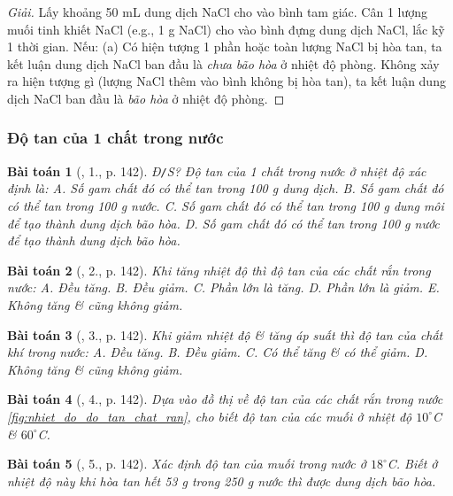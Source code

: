 \documentclass{article}
\newtheorem{baitoan}{Bài toán}
\begin{document}
\begin{proof}[Giải]
	Lấy khoảng 50 mL dung dịch NaCl cho vào bình tam giác. Cân 1 lượng muối tinh khiết NaCl (e.g., 1 g NaCl) cho vào bình đựng dung dịch NaCl, lắc kỹ 1 thời gian. Nếu: (a) Có hiện tượng 1 phần hoặc toàn lượng NaCl bị hòa tan, ta kết luận dung dịch NaCl ban đầu là \textit{chưa bão hòa} ở nhiệt độ phòng. Không xảy ra hiện tượng gì (lượng NaCl thêm vào bình không bị hòa tan), ta kết luận dung dịch NaCl ban đầu là \textit{bão hòa} ở nhiệt độ phòng.
\end{proof}

\subsubsection{Độ tan của 1 chất trong nước}

\begin{baitoan}[\cite{SGK_Hoa_Hoc_8}, 1., p. 142]
	\emph{Đ\texttt{/}S?} Độ tan của 1 chất trong nước ở nhiệt độ xác định là: {\sf A.} Số gam chất đó có thể tan trong \emph{100 g} dung dịch. {\sf B.} Số gam chất đó có thể tan trong \emph{100 g} nước. {\sf C.} Số gam chất đó có thể tan trong \emph{100 g} dung môi để tạo thành dung dịch bão hòa. {\sf D.} Số gam chất đó có thể tan trong \emph{100 g} nước để tạo thành dung dịch bão hòa.
\end{baitoan}

\begin{baitoan}[\cite{SGK_Hoa_Hoc_8}, 2., p. 142]
	Khi tăng nhiệt độ thì độ tan của các chất rắn trong nước: {\sf A.} Đều tăng. {\sf B.} Đều giảm. {\sf C.} Phần lớn là tăng. {\sf D.} Phần lớn là giảm. {\sf E.} Không tăng \& cũng không giảm.
\end{baitoan}

\begin{baitoan}[\cite{SGK_Hoa_Hoc_8}, 3., p. 142]
	Khi giảm nhiệt độ \& tăng áp suất thì độ tan của chất khí trong nước: {\sf A.} Đều tăng. {\sf B.} Đều giảm. {\sf C.} Có thể tăng \& có thể giảm. {\sf D.} Không tăng \& cũng không giảm.
\end{baitoan}

\begin{baitoan}[\cite{SGK_Hoa_Hoc_8}, 4., p. 142]
	Dựa vào đồ thị về độ tan của các chất rắn trong nước \ref{fig:nhiet_do_do_tan_chat_ran}, cho biết độ tan của các muối \emph{} ở nhiệt độ $10^\circ$\emph{C} \& $60^\circ$C.
\end{baitoan}

\begin{baitoan}[\cite{SGK_Hoa_Hoc_8}, 5., p. 142]
	Xác định độ tan của muối \emph{} trong nước ở $18^\circ$\emph{C}. Biết ở nhiệt độ này khi hòa tan hết \emph{53 g } trong \emph{250 g} nước thì được dung dịch bão hòa.
\end{baitoan}
\end{document}
